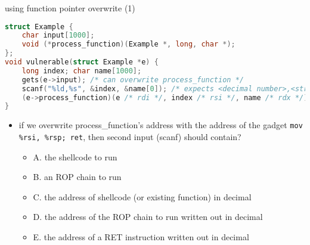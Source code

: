 \begin{frame}[fragile,label=useFPtrOverwrite1]{using function pointer overwrite (1)}
\begin{lstlisting}[language=C,style=script]
struct Example {
    char input[1000];
    void (*process_function)(Example *, long, char *);
};
void vulnerable(struct Example *e) {
    long index; char name[1000];
    gets(e->input); /* can overwrite process_function */
    scanf("%ld,%s", &index, &name[0]); /* expects <decimal number>,<string> */
    (e->process_function)(e /* rdi */, index /* rsi */, name /* rdx */);
}
\end{lstlisting}
\begin{itemize}
\item \small if we overwrite process\_function's address with the address of the gadget
    \texttt{mov \%rsi, \%rsp; ret}, then second input (scanf) should contain?
    \begin{itemize}
    \item A. the shellcode to run
    \item B. an ROP chain to run
    \item C. the address of shellcode (or existing function) in decimal
    \item D. the address of the ROP chain to run written out in decimal
    \item E. the address of a RET instruction written out in decimal
    \end{itemize}
\end{itemize}
\end{frame}

